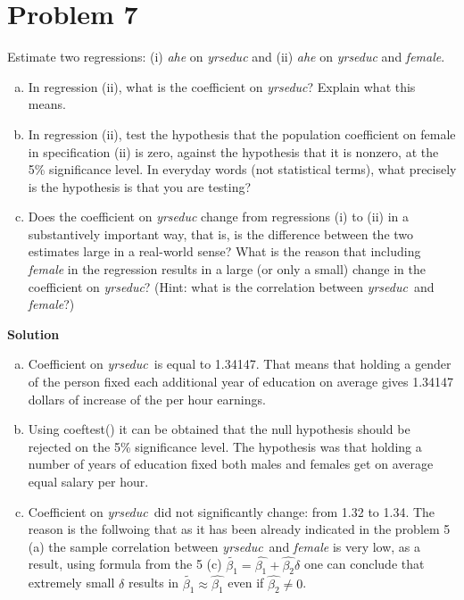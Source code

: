 \documentclass[a4paper]{article}
\newcommand{\yrseduc}{\textit{yrseduc}}
\begin{document}
\section*{Problem 7}
Estimate two regressions: (i) \textit{ahe} on \textit{yrseduc} and (ii) \textit{ahe} on \textit{yrseduc} and \textit{female}.
\begin{enumerate}[(a)]
\item In regression (ii), what is the coefficient on \yrseduc? Explain what this means.
\item In regression (ii), test the hypothesis that the population coefficient on female in
specification (ii) is zero, against the hypothesis that it is nonzero, at the 5\% significance level.
In everyday words (not statistical terms), what precisely is the hypothesis is that you are
testing?
\item Does the coefficient on \textit{yrseduc} change from regressions (i) to (ii) in a substantively
important way, that is, is the difference between the two estimates large in a real-world sense?
What is the reason that including \textit{female} in the regression results in a large (or only a small)
change in the coefficient on \yrseduc? (Hint: what is the correlation between \yrseduc\ and
\textit{female}?)

\end{enumerate}


\textbf{Solution}

\begin{enumerate}[(a)]
	\item Coefficient on \yrseduc\ is equal to 1.34147. That means that holding a gender of the person fixed each additional year of education on average gives 1.34147 dollars of increase of the per hour earnings.
	\item Using coeftest() it can be obtained that the null hypothesis should be rejected on the 5\% significance level. The hypothesis was that holding a number of years of education fixed both males and females get on average equal salary per hour.
	\item Coefficient on \yrseduc\ did not significantly change: from 1.32 to 1.34. The reason is the follwoing that as it has been already indicated in the problem 5 (a) the sample correlation between \yrseduc\ and \textit{female} is very low, as a result, using formula from the 5 (c) $\tilde{\beta_1} = \hat{\beta_1} + \hat{\beta_2} \delta$ one can conclude that extremely small $\delta$ results in $\tilde{\beta_1} \approx \hat{\beta_1}$ even if $\hat{\beta_2} \neq 0$.
\end{enumerate}
\end{document}
